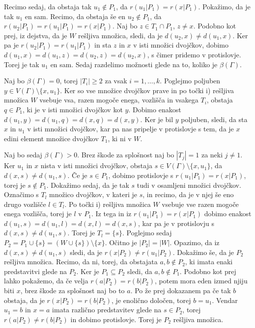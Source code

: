 \documentclass[mat1, tisk]{fmfdelo}
\begin{document}
\begin{dokaz}
  Recimo sedaj, da obstaja tak $u_1 \notin P_1$, da $r(u_1|P_1) = r(x|P_1)$. Pokažimo, da je 
  tak $u_1$ en sam. Recimo, da obstaja še en $u_2 \notin P_1$, da 
  $r(u_2|P_1) = r(u_1|P_1) = r(x|P_1)$. Naj bo $z \in T_1 \cap P_1$, $z \neq x$. Podobno kot prej, iz 
  dejstva, da je $W$ rešljiva množica, sledi, da je $d(u_2, x) \neq d(u_1, x)$. Ker pa je 
  $r(u_2|P_1) = r(u_1|P_1)$ in sta $z$ in $x$ v isti množici dvojčkov, dobimo 
  $d(u_1, x) = d(u_1, z) = d(u_2, z) = d(u_2, x)$, s čimer pridemo v protislovje. Torej je 
  tak $u_1$ en sam. Sedaj razdelimo možnosti glede na to, koliko je $\beta(\Gamma)$.

  Naj bo $\beta(\Gamma) = 0$, torej $|T_i| \geq 2$ za vsak $i = 1, \ldots, k$. Poglejmo 
  poljuben $y \in V(\Gamma) \setminus \{x, u_1\}$. Ker so vse množice dvojčkov prave in 
  po točki i) rešljiva množica $W$ vsebuje vsa, razen mogoče enega, vozlišča in vsakega $T_i$, 
  obstaja $q \in P_1$, ki je v isti množici dvojčkov kot $y$. Dobimo enakost 
  $d(u_1, y) = d(u_1, q) = d(x, q) = d(x, y)$. Ker je bil $y$ poljuben, sledi, da 
  sta $x$ in $u_1$ v isti množici dvojčkov, kar pa nas pripelje v protislovje s 
  tem, da je $x$ edini element množice dvojčkov $T_1$, ki ni v $W$.

  Naj bo sedaj $\beta(\Gamma) > 0$. Brez škode za splošnost naj bo $|T_j| = 1$ za neki $j \neq 1$. 
  Ker $u_1$ in $x$ nista v isti množici dvojčkov, 
  obstaja $s \in V(\Gamma) \setminus \{x, u_1\}$, da $d(x, s) \neq d(u_1, s)$. Če je $s \in P_1$, 
  dobimo protislovje s $r(u_1|P_1) = r(x|P_1)$, torej je $s \notin P_1$. Dokažimo sedaj, 
  da je tak $s$ tudi v osamljeni množici dvojčkov. Označimo s $T_l$ množico dvojčkov, v kateri 
  je $s$, in recimo, da je v njej še eno drugo vozlišče $l \in T_l$. Po točki i) rešljiva 
  množica $W$ vsebuje vse razen mogoče enega vozlišča, torej je $l$ v $P_1$. 
  Iz tega in iz $r(u_1|P_1) = r(x|P_1)$ dobimo enakost 
  $d(u_1, s) = d(u_1, l) = d(x, l) = d(x, s)$, kar pa je v 
  protislovju s $d(x, s) \neq d(u_1, s)$. Torej je $T_l = \{s\}$. Poglejmo sedaj 
  $P_2 = P_1 \cup \{s\} = (W \cup \{s\}) \setminus \{x\}$. Očitno je $|P_2| = |W|$. Opazimo, 
  da iz $d(x, s) \neq d(u_1, s)$ sledi, da je $r(x|P_2) \neq r(u_1|P_2)$. Dokažimo še, da je 
  $P_2$ rešljiva množica. Recimo, da ni, torej, da obstajata $a, b \notin P_2$, ki imata 
  enaki predstavitvi glede na $P_2$. Ker je $P_1 \subseteq P_2$ sledi, 
  da $a, b \notin P_1$. Podobno kot prej lahko pokažemo, da če velja $r(a|P_2) = r(b|P_2)$, 
  potem mora eden izmed njiju biti $x$, brez škode za splošnost naj bo to $a$. Po že prej 
  dokazanem pa če tak $b$ obstaja, da je $r(x|P_2) = r(b|P_2)$, je enolično določen, 
  torej $b = u_1$. Vendar $u_1 = b$ in $x = a$ imata različno predstavitev glede na $s \in P_2$, 
  torej $r(a|P_2) \neq r(b|P_2)$ in dobimo protislovje. Torej je $P_2$ rešljiva množica.


\end{dokaz}
\end{document}

